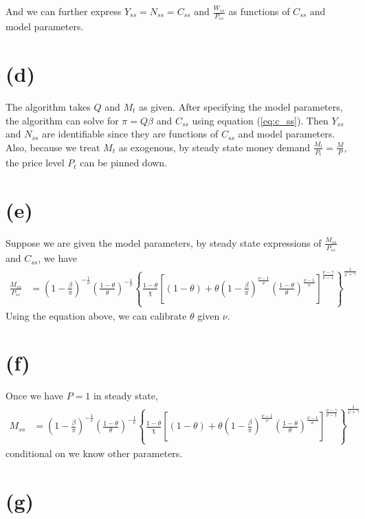 \documentclass[12pt]{article}
\begin{document}
And we can further express $Y_{ss} = N_{ss} = C_{ss}$ 
and $\frac{W_{ss}}{P_{ss}}$ as functions of $C_{ss}$ and model parameters.


\section*{(d)}

The algorithm takes $Q$ and $M_t$ as given. 
After specifying the model parameters, 
the algorithm can solve for $\pi = Q \beta$ and $C_{ss}$ using equation (\ref{eq:c_ss}). 
Then $Y_{ss}$ and $N_{ss}$ are identifiable 
since they are functions of $C_{ss}$ and model parameters. 
Also, because we treat $M_t$ as exogenous, 
by steady state money demand $\frac{M_t}{P_t} = \frac{M}{P}$, 
the price level $P_t$ can be pinned down.

\section*{(e)}

Suppose we are given the model parameters, 
by steady state expressions of $\frac{M_{ss}}{P_{ss}}$ and $C_{ss}$, 
we have
\begin{align*}
\frac{M_{ss}}{P_{ss}} 
&= \left(1 - \frac{\beta}{\pi}\right)^{-\frac{1}{\nu}} 
\left(\frac{1 - \theta}{\theta}\right)^{-\frac{1}{\nu}} 
\left\{\frac{1-\theta}{\chi}
\left[(1 - \theta) + \theta \left(1 - \frac{\beta}{\pi}\right)^{\frac{\nu-1}{\nu}} \left(\frac{1-\theta}{\theta}\right)^{\frac{\nu-1}{\nu}}\right]^{\frac{\nu-\gamma}{\nu-1}}\right\}^{\frac{1}{\varphi+\gamma}}
\end{align*}
Using the equation above, we can calibrate $\theta$ given $\nu$.

\section*{(f)}

Once we have $P = 1$ in steady state,
\begin{align*}
M_{ss}
&= \left(1 - \frac{\beta}{\pi}\right)^{-\frac{1}{\nu}} 
\left(\frac{1 - \theta}{\theta}\right)^{-\frac{1}{\nu}} 
\left\{\frac{1-\theta}{\chi}
\left[(1 - \theta) + \theta \left(1 - \frac{\beta}{\pi}\right)^{\frac{\nu-1}{\nu}} \left(\frac{1-\theta}{\theta}\right)^{\frac{\nu-1}{\nu}}\right]^{\frac{\nu-\gamma}{\nu-1}}\right\}^{\frac{1}{\varphi+\gamma}}
\end{align*}
conditional on we know other parameters.

\section*{(g)}
\end{document}
